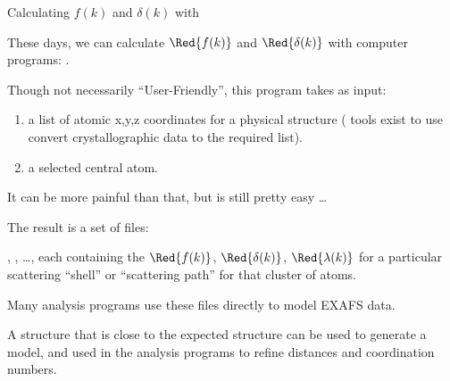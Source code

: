 
\begin{slide}{Calculating  ${f(k)}$ and ${\delta(k)}$ with {\feff} }

    
    These days, we can calculate ${\Red{f(k)}}$ and
    ${{\Red{\delta(k)}}}$ with computer programs: {\feff}.
    
    Though not necessarily ``User-Friendly'', this program takes as input:

    \begin{enumerate}
    \item a list of atomic x,y,z coordinates for a physical structure (
      tools %
      exist to
      use convert crystallographic data to the required list).  
    \item a selected central atom.
    \end{enumerate}
    
    \pause It can be more painful than that, but is still pretty easy \ldots

    \vmm \pause
    The result is a set of files: 

    {},
    {}, \ldots, each containing the
    ${\Red{f(k)}}$, ${{\Red{\delta(k)}}}$,
    ${{\Red{\lambda(k)}}}$ for a particular scattering ``shell'' or
    ``scattering path'' for that cluster of atoms.
    
    \vmm \vmm
    
    Many analysis programs use these {\feff} files directly to model EXAFS
    data.

    \vmm
    
    \begin{cenpage}{89mm}
      
      A structure that is close to the expected structure can be used to
      generate a {\feff} model, and used in the analysis programs to refine
      distances and coordination numbers.
      
    \end{cenpage}

  \vfill
\end{slide} 

